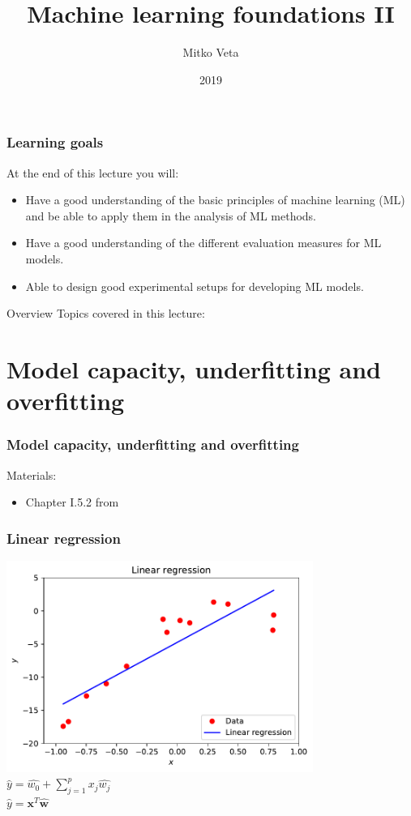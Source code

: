 \documentclass[notes]{beamer}          %
\title{Machine learning foundations II}
\author{Mitko Veta}
\institute{Eindhoven University of Technology

Department of Biomedical Engineering}
\date{2019}
\newcommand{\vect}[1]{\bm{#1}}
\begin{document}
\frame{\titlepage}

\begin{frame}
\frametitle{Learning goals}

At the end of this lecture you will:
\begin{itemize}
    \item Have a good understanding of the basic principles of machine learning (ML) and be able to apply them in the analysis of ML methods.
    \item Have a good understanding of the different evaluation measures for ML models.
    \item Able to design good experimental setups for developing ML models.
\end{itemize}
\end{frame}

\begin{frame}{Overview}
Topics covered in this lecture:
    \tableofcontents
\end{frame}

\section{Model capacity, underfitting and overfitting}

\begin{frame}
\frametitle{Model capacity, underfitting and overfitting}
Materials:
\begin{itemize}
    \item Chapter I.5.2 from \cite{deeplearning}
\end{itemize}
\end{frame}

\begin{frame}
\frametitle{Linear regression}
    \begin{center}
            \includegraphics[width=0.75\textwidth]{figures/week_2/linear_regression.pdf} \\
            $\hat{y} = \hat{w_0} + \sum_{j=1}^{p} x_j \hat{w_j}$ \\
            $\hat{y} = \vect{x}^T \hat{\vect{w}}$
    \end{center}
\end{frame}
\end{document}

